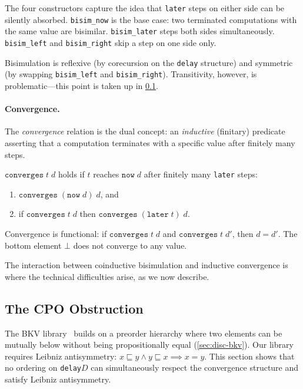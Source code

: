 \noindent
The four constructors capture the idea that \texttt{later} steps on
either side can be silently absorbed.
\texttt{bisim\_now} is the base case: two terminated computations
with the same value are bisimilar.
\texttt{bisim\_later} steps both sides simultaneously.
\texttt{bisim\_left} and \texttt{bisim\_right} skip a step on one
side only.

Bisimulation is reflexive (by corecursion on the \texttt{delay}
structure) and symmetric (by swapping \texttt{bisim\_left} and
\texttt{bisim\_right}).
Transitivity, however, is problematic---this point is taken up in
\cref{sec:disc-lift-obstruction}.

\paragraph{Convergence.}
The \emph{convergence} relation is the dual concept: an
\emph{inductive} (finitary) predicate asserting that a computation
terminates with a specific value after finitely many steps.

\begin{definition}[Convergence]
\label{def:convergence}
$\texttt{converges}\;t\;d$ holds if $t$ reaches
$\texttt{now}\;d$ after finitely many \texttt{later} steps:
\begin{enumerate}
  \item $\texttt{converges}\;(\texttt{now}\;d)\;d$, and
  \item if $\texttt{converges}\;t\;d$ then
    $\texttt{converges}\;(\texttt{later}\;t)\;d$.
\end{enumerate}
Convergence is functional: if $\texttt{converges}\;t\;d$ and
$\texttt{converges}\;t\;d'$, then $d = d'$.
The bottom element $\bot$ does not converge to any value.
\end{definition}

\noindent
The interaction between coinductive bisimulation and inductive
convergence is where the technical difficulties arise, as we now
describe.

\subsection{The CPO Obstruction}
\label{sec:disc-lift-obstruction}

The BKV library~\cite{BKV2009} builds on a preorder hierarchy where
two elements can be mutually below without being propositionally
equal (\cref{sec:disc-bkv}).
Our library requires Leibniz antisymmetry:
$x \sqsubseteq y \land y \sqsubseteq x \implies x = y$.
This section shows that no ordering on \texttt{delay}\;$D$ can
simultaneously respect the convergence structure and satisfy Leibniz
antisymmetry.

